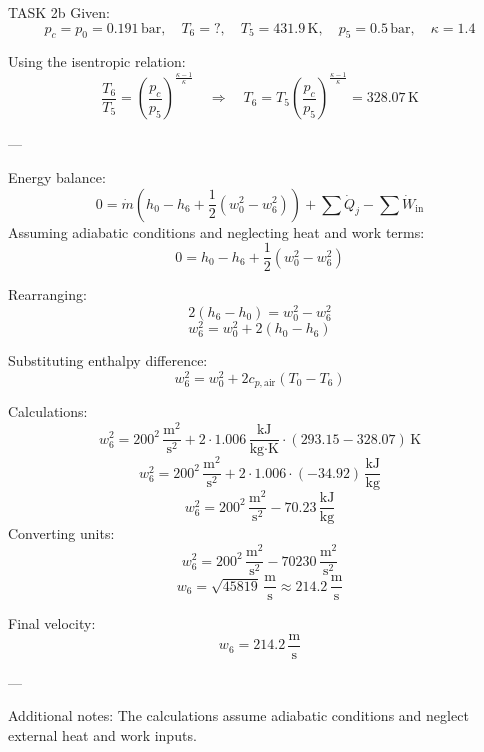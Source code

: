 TASK 2b  
Given:  
\[
p_c = p_0 = 0.191 \, \text{bar}, \quad T_6 = ?, \quad T_5 = 431.9 \, \text{K}, \quad p_5 = 0.5 \, \text{bar}, \quad \kappa = 1.4
\]  

Using the isentropic relation:  
\[
\frac{T_6}{T_5} = \left( \frac{p_c}{p_5} \right)^{\frac{\kappa - 1}{\kappa}} \quad \Rightarrow \quad T_6 = T_5 \left( \frac{p_c}{p_5} \right)^{\frac{\kappa - 1}{\kappa}} = 328.07 \, \text{K}
\]  

---

Energy balance:  
\[
0 = \dot{m} \left( h_0 - h_6 + \frac{1}{2} \left( w_0^2 - w_6^2 \right) \right) + \sum \dot{Q}_j - \sum \dot{W}_{\text{in}}
\]  
Assuming adiabatic conditions and neglecting heat and work terms:  
\[
0 = h_0 - h_6 + \frac{1}{2} \left( w_0^2 - w_6^2 \right)
\]  

Rearranging:  
\[
2 \left( h_6 - h_0 \right) = w_0^2 - w_6^2
\]  
\[
w_6^2 = w_0^2 + 2 \left( h_0 - h_6 \right)
\]  

Substituting enthalpy difference:  
\[
w_6^2 = w_0^2 + 2 c_{p,\text{air}} \left( T_0 - T_6 \right)
\]  

Calculations:  
\[
w_6^2 = 200^2 \, \frac{\text{m}^2}{\text{s}^2} + 2 \cdot 1.006 \, \frac{\text{kJ}}{\text{kg·K}} \cdot \left( 293.15 - 328.07 \right) \, \text{K}
\]  
\[
w_6^2 = 200^2 \, \frac{\text{m}^2}{\text{s}^2} + 2 \cdot 1.006 \cdot (-34.92) \, \frac{\text{kJ}}{\text{kg}}
\]  
\[
w_6^2 = 200^2 \, \frac{\text{m}^2}{\text{s}^2} - 70.23 \, \frac{\text{kJ}}{\text{kg}}
\]  
Converting units:  
\[
w_6^2 = 200^2 \, \frac{\text{m}^2}{\text{s}^2} - 70230 \, \frac{\text{m}^2}{\text{s}^2}
\]  
\[
w_6 = \sqrt{45819} \, \frac{\text{m}}{\text{s}} \approx 214.2 \, \frac{\text{m}}{\text{s}}
\]  

Final velocity:  
\[
w_6 = 214.2 \, \frac{\text{m}}{\text{s}}
\]  

---

Additional notes:  
The calculations assume adiabatic conditions and neglect external heat and work inputs.